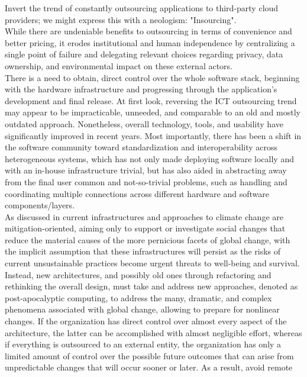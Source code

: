 Invert the trend of constantly outsourcing applications to third-party cloud providers;
we might express this with a neologism: "Insourcing". \\ %
While there are undeniable benefits to outsourcing in terms of convenience and better
pricing, it erodes institutional and human independence by centralizing a single
point of failure and delegating relevant choices regarding privacy, data ownership,
and environmental impact on these external actors\cite{conceptualising_resource_aware}.
\\ %
There is a need to obtain, direct control over the whole software stack, beginning
with the hardware infrastructure and progressing through the application's development
and final release. At first look, reversing the ICT outsourcing trend may appear
to be impracticable, unneeded, and comparable to an old and mostly outdated approach.
Nonetheless, overall technology, tools, and usability have significantly improved
in recent years. Most importantly, there has been a shift in the software community
toward standardization and interoperability across heterogeneous systems, which
has not only made deploying software locally and with an in-house infrastructure
trivial, but has also aided in abstracting away from the final user common and not-so-trivial
problems, such as handling and coordinating multiple connections across
different hardware and software components/layers. \\ %
As discussed in \cite{precarious_infrastructure} current infrastructures and
approaches to climate change are mitigation-oriented, aiming only to support or investigate
social changes that reduce the material causes of the more pernicious facets of global
change, with the implicit assumption that these infrastructures will persist as
the risks of current unsustainable practices become urgent threats to well-being
and survival. Instead, new architectures, and possibly old ones through refactoring
and rethinking the overall design, must take and address new approaches, denoted
as post-apocalyptic computing, to address the many, dramatic, and complex
phenomena associated with global change, allowing to prepare for nonlinear changes.
If the organization has direct control over almost every aspect of the
architecture, the latter can be accomplished with almost negligible effort,
whereas if everything is outsourced to an external entity, the organization has only
a limited amount of control over the possible future outcomes that can arise from
unpredictable changes that will occur sooner or later. As a result, avoid remote
